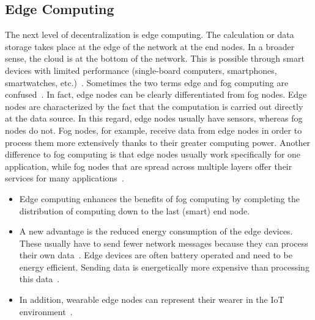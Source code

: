 \documentclass[english,version-2019-11]{uzl-thesis}
\begin{document}
\subsection{Edge Computing}
The next level of decentralization is edge computing.
The calculation or data storage takes place at the edge
of the network at the end nodes. In a broader sense,
the cloud is at the bottom of the network. This is possible
through smart devices with limited performance
(single-board computers, smartphones, smartwatches, etc.)~\cite{IoTSimEdge}.
Sometimes the two terms edge and fog computing are confused~\cite{FogCompConc}.
In fact, edge nodes can be clearly
differentiated from fog nodes.
Edge nodes are characterized by the fact that the
computation is carried out directly at the data source.
In this regard, edge nodes usually have sensors,
whereas fog nodes do not. Fog nodes, for example,
receive data from edge nodes in order to process them more
extensively thanks to their greater computing power.
Another difference to fog computing is that edge nodes usually
work specifically for one application, while fog nodes that are spread
across multiple layers offer their services for many applications~\cite{FogCompConc}.
\begin{itemize}
\item  Edge computing enhances the benefits of fog computing
by completing the distribution of computing down
to the last (smart) end node.
\item A new advantage is the reduced energy consumption
of the edge devices. These usually have to send fewer network
messages because they can process their own data~\cite{Path2IoT}.
Edge devices are often battery operated
and need to be energy efficient. Sending data is energetically
more expensive than processing this data~\cite{IoTSimEdge}.
\item In addition, wearable edge nodes can represent
their wearer in the IoT environment~\cite{SimOverview}.
\end{itemize}
\end{document}
